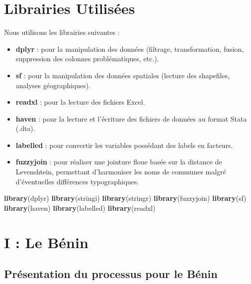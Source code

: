 \documentclass[
]{article}
\newenvironment{Shaded}{\begin{snugshade}}{\end{snugshade}}
\newcommand{\FunctionTok}[1]{\textcolor[rgb]{0.13,0.29,0.53}{\textbf{#1}}}
\newcommand{\NormalTok}[1]{#1}
\providecommand{\tightlist}{%
  \setlength{\itemsep}{0pt}\setlength{\parskip}{0pt}}
\begin{document}
\hypertarget{librairies-utilisuxe9es}{%
\section{Librairies Utilisées}\label{librairies-utilisuxe9es}}

Nous utilisons les librairies suivantes :

\begin{itemize}
\tightlist
\item
  \textbf{dplyr} : pour la manipulation des données (filtrage,
  transformation, fusion, suppression des colonnes problématiques,
  etc.).
\item
  \textbf{sf} : pour la manipulation des données spatiales (lecture des
  shapefiles, analyses géographiques).
\item
  \textbf{readxl} : pour la lecture des fichiers Excel.
\item
  \textbf{haven} : pour la lecture et l'écriture des fichiers de données
  au format Stata (.dta).
\item
  \textbf{labelled} : pour convertir les variables possédant des labels
  en facteurs.
\item
  \textbf{fuzzyjoin} : pour réaliser une jointure floue basée sur la
  distance de Levenshtein, permettant d'harmoniser les noms de communes
  malgré d'éventuelles différences typographiques.
\end{itemize}

\begin{Shaded}
\begin{Highlighting}[]
\FunctionTok{library}\NormalTok{(dplyr)}
\FunctionTok{library}\NormalTok{(stringi)}
\FunctionTok{library}\NormalTok{(stringr)}
\FunctionTok{library}\NormalTok{(fuzzyjoin)}
\FunctionTok{library}\NormalTok{(sf)}
\FunctionTok{library}\NormalTok{(haven)}
\FunctionTok{library}\NormalTok{(labelled)}
\FunctionTok{library}\NormalTok{(readxl)}
\end{Highlighting}
\end{Shaded}

\hypertarget{i-le-buxe9nin}{%
\section{I : Le Bénin}\label{i-le-buxe9nin}}

\hypertarget{pruxe9sentation-du-processus-pour-le-buxe9nin}{%
\subsection{Présentation du processus pour le
Bénin}\label{pruxe9sentation-du-processus-pour-le-buxe9nin}}
\end{document}
